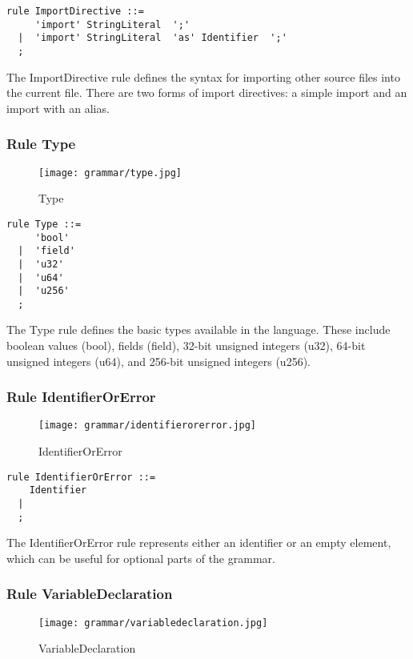 \begin{lstlisting}
rule ImportDirective ::=
     'import' StringLiteral  ';' 
  |  'import' StringLiteral  'as' Identifier  ';' 
  ;
\end{lstlisting}

The ImportDirective rule defines the syntax for importing other source files into the current file. There are two forms of import directives: a simple import and an import with an alias.

\subsubsection*{Rule Type}

\begin{figure}[!ht]
\centering
\texttt{[image: grammar/type.jpg]}
\caption{Type}
\end{figure}

\begin{lstlisting}
rule Type ::=
     'bool' 
  |  'field' 
  |  'u32' 
  |  'u64' 
  |  'u256' 
  ;
\end{lstlisting}

The Type rule defines the basic types available in the language. These include boolean values (bool), fields (field), 32-bit unsigned integers (u32), 64-bit unsigned integers (u64), and 256-bit unsigned integers (u256).

\subsubsection*{Rule IdentifierOrError}

\begin{figure}[!ht]
\centering
\texttt{[image: grammar/identifierorerror.jpg]}
\caption{IdentifierOrError}
\end{figure}

\begin{lstlisting}
rule IdentifierOrError ::=
    Identifier 
  | 
  ;
\end{lstlisting}

The IdentifierOrError rule represents either an identifier or an empty element, which can be useful for optional parts of the grammar.

\subsubsection*{Rule VariableDeclaration}

\begin{figure}[!ht]
\centering
\texttt{[image: grammar/variabledeclaration.jpg]}
\caption{VariableDeclaration}
\end{figure}

